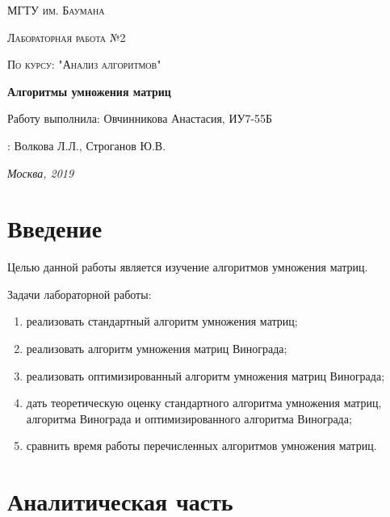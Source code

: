 \documentclass[a4paper,14pt]{report}
\begin{document}
\begin{titlepage}
	\centering
	{\scshape\LARGE МГТУ им. Баумана \par}
	\vspace{3cm}
	{\scshape\Large Лабораторная работа №2\par}
	\vspace{0.5cm}
	{\scshape\Large По курсу: "Анализ алгоритмов"\par}
	\vspace{1.5cm}
	{\huge\bfseries Алгоритмы умножения матриц\par}
	\vspace{2cm}
	\Large Работу выполнила: Овчинникова Анастасия, ИУ7-55Б\par
	\vspace{0.5cm}
	:  Волкова Л.Л., Строганов Ю.В.\par

	\vfill
	\large \textit {Москва, 2019} \par
\end{titlepage}

\tableofcontents

\newpage
\chapter*{Введение}

Целью данной работы является изучение алгоритмов умножения матриц.

Задачи лабораторной работы:
\begin{enumerate}
	\item реализовать стандартный алгоритм умножения матриц;
	\item реализовать алгоритм умножения матриц Винограда;
	\item реализовать оптимизированный алгоритм умножения матриц Винограда;
	\item дать теоретическую оценку стандартного алгоритма умножения матриц, алгоритма Винограда и оптимизированного алгоритма Винограда;
	\item сравнить время работы перечисленных алгоритмов умножения матриц.
\end{enumerate}


\chapter*{Аналитическая часть}
\end{document}
